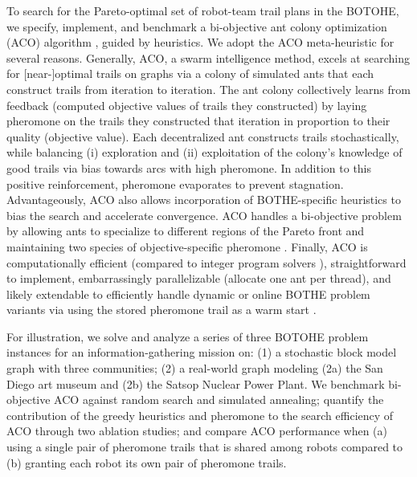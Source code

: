 \documentclass[fleqn,10pt,lineno]{wlpeerj}
\begin{document}
To search for the Pareto-optimal set of robot-team trail plans in the BOTOHE, we specify, implement, and benchmark a bi-objective ant colony optimization (ACO) algorithm \cite{iredi2001bi}, guided by heuristics.
We adopt the ACO meta-heuristic \cite{dorigo2006ant,bonabeau1999swarm,blum2005ant} for several reasons.
Generally, ACO, a swarm intelligence method, excels at searching for [near-]optimal trails on graphs via a colony of simulated ants that each construct trails from iteration to iteration.  
The ant colony collectively learns from feedback (computed objective values of trails they constructed) by laying pheromone on the trails they constructed that iteration in proportion to their quality (objective value). Each decentralized ant constructs trails stochastically, while balancing (i) exploration and (ii) exploitation of the colony's knowledge of good trails via bias towards arcs with high pheromone. 
In addition to this positive reinforcement, pheromone evaporates to prevent stagnation. 
Advantageously, ACO also allows incorporation of BOTHE-specific heuristics to bias the search and accelerate convergence.
ACO handles a bi-objective problem by allowing ants to specialize to different regions of the Pareto front and maintaining two species of objective-specific pheromone \cite{iredi2001bi}.
Finally, ACO is computationally efficient (compared to integer program solvers \cite{pascariu2021train}), straightforward to implement, embarrassingly parallelizable (allocate one ant per thread), and likely extendable to efficiently handle dynamic or online BOTHE problem variants via using the stored pheromone trail as a warm start \cite{montemanni2005ant}.

For illustration, we solve and analyze a series of three BOTOHE problem instances for an information-gathering mission on:
(1) a stochastic block model graph with three communities;
(2) a real-world graph modeling (2a) the San Diego art museum and (2b) the Satsop Nuclear Power Plant.
We benchmark bi-objective ACO against random search and simulated annealing; quantify the contribution of the greedy heuristics and pheromone to the search efficiency of ACO through two ablation studies; and compare ACO performance when (a) using a single pair of pheromone trails that is shared among robots compared to (b) granting each robot its own pair of pheromone trails.
\end{document}

